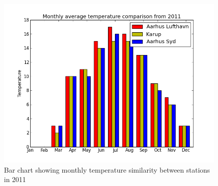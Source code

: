 \begin{figure}[h!]
\centering
\includegraphics[width=0.99\linewidth,natwidth=898,natheight=587]{billeder/barChartMonthlyAverageTemperature2011.png}
\caption{Bar chart showing monthly temperature similarity between stations in 2011}
\label{fig:barChartMonthlyAverageTemperature2011}
\end{figure}


